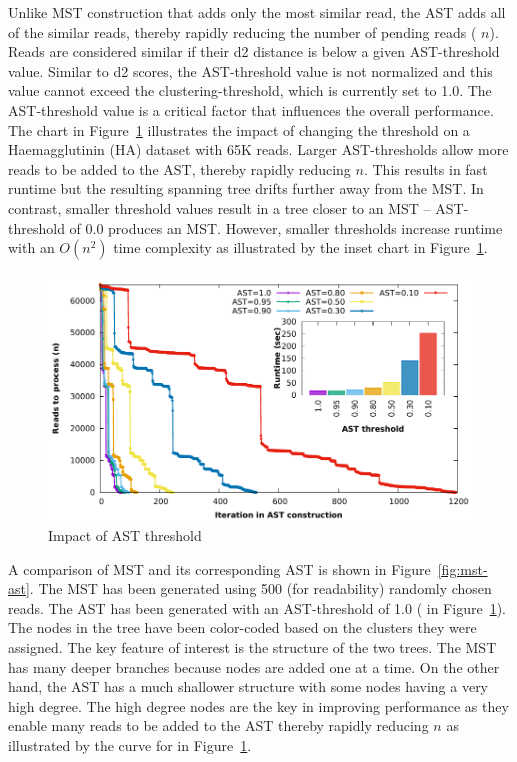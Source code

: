 Unlike MST construction that adds only the most similar read, the AST
adds all of the similar reads, thereby rapidly reducing the number of
pending reads (\ie\/ $n$).  Reads are considered similar if their d2
distance is below a given AST-threshold value.  Similar to d2 scores,
the AST-threshold value is not normalized and this value cannot exceed
the clustering-threshold, which is currently set to 1.0.  The
AST-threshold value is a critical factor that influences the overall
performance.  The chart in Figure~\ref{fig:ast-thresh} illustrates the
impact of changing the threshold on a Haemagglutinin (HA) dataset with
\mytilde 65K reads.  Larger AST-thresholds allow more reads to be
added to the AST, thereby rapidly reducing $n$.  This results in fast
runtime but the resulting spanning tree drifts further away from the
MST.  In contrast, smaller threshold values result in a tree closer to
an MST -- \ie\/ AST-threshold of 0.0 produces an MST.  However,
smaller thresholds increase runtime with an $O(n^{2})$ time complexity
as illustrated by the inset chart in Figure~\ref{fig:ast-thresh}.

\begin{figure}
  \centerline{\includegraphics[width=\linewidth]{../charts/ha_1500_maxUse_convergence/maxUse_convergence.pdf}}
  \caption{Impact of AST threshold}\label{fig:ast-thresh}
\end{figure}

A comparison of MST and its corresponding AST is shown in
Figure~\ref{fig:mst-ast}.  The MST has been generated using 500 (for
readability) randomly chosen reads.  The AST has been generated with
an AST-threshold of 1.0 (\ie\/  in
Figure~\ref{fig:ast-thresh}).  The nodes in the tree have been
color-coded based on the clusters they were assigned.  The key feature
of interest is the structure of the two trees.  The MST has many
deeper branches because nodes are added one at a time.  On the other
hand, the AST has a much shallower structure with some nodes having a
very high degree.  The high degree nodes are the key in improving
performance as they enable many reads to be added to the AST thereby
rapidly reducing $n$ as illustrated by the curve for  in
Figure~\ref{fig:ast-thresh}.

